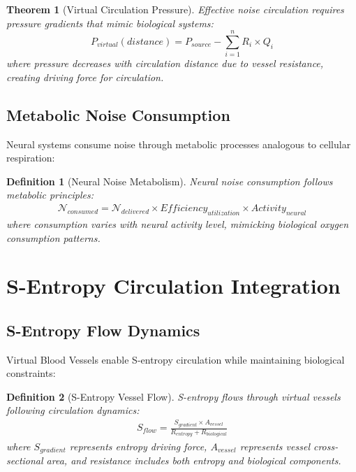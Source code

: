 \documentclass[12pt,a4paper]{article}
\newtheorem{theorem}{Theorem}
\newtheorem{definition}{Definition}
\begin{document}
\begin{theorem}[Virtual Circulation Pressure]
Effective noise circulation requires pressure gradients that mimic biological systems:
\begin{equation}
P_{virtual}(distance) = P_{source} - \sum_{i=1}^{n} R_i \times Q_i
\end{equation}
where pressure decreases with circulation distance due to vessel resistance, creating driving force for circulation.
\end{theorem}

\subsection{Metabolic Noise Consumption}

Neural systems consume noise through metabolic processes analogous to cellular respiration:

\begin{definition}[Neural Noise Metabolism]
Neural noise consumption follows metabolic principles:
\begin{align}
\mathcal{N}_{consumed} = \mathcal{N}_{delivered} \times Efficiency_{utilization} \times Activity_{neural}
\end{align}
where consumption varies with neural activity level, mimicking biological oxygen consumption patterns.
\end{definition}

\section{S-Entropy Circulation Integration}

\subsection{S-Entropy Flow Dynamics}

Virtual Blood Vessels enable S-entropy circulation while maintaining biological constraints:

\begin{definition}[S-Entropy Vessel Flow]
S-entropy flows through virtual vessels following circulation dynamics:
\begin{align}
S_{flow} = \frac{S_{gradient} \times A_{vessel}}{R_{entropy} + R_{biological}}
\end{align}
where $S_{gradient}$ represents entropy driving force, $A_{vessel}$ represents vessel cross-sectional area, and resistance includes both entropy and biological components.
\end{definition}
\end{document}
